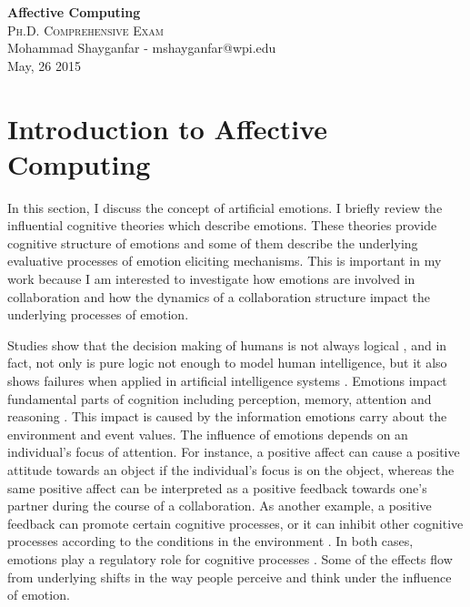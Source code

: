 \documentclass[11pt]{article}
\begin{document}

\begin{center}
{\LARGE{\textbf{Affective Computing}}} \\
\Large\textsc{Ph.D. Comprehensive Exam} \\[1em]
\large\textnormal{Mohammad Shayganfar - mshayganfar@wpi.edu} \\
\large\textnormal{May, 26 2015}
\end{center}

\section{Introduction to Affective Computing}

In this section, I discuss the concept of artificial emotions. I briefly review
the influential cognitive theories which describe emotions. These theories
provide cognitive structure of emotions and some of them describe the underlying
evaluative processes of emotion eliciting mechanisms. This is important in my
work because I am interested to investigate how emotions are involved in
collaboration and how the dynamics of a collaboration structure impact the
underlying processes of emotion.

Studies show that the decision making of
humans is not always logical \cite{GrossbergGutowski:affect-cognition}, and in
fact, not only is pure logic not enough to model human intelligence, but it also
shows failures when applied in artificial intelligence systems
\cite{dreyfus:artificial-critique}. Emotions impact fundamental parts of
cognition including perception, memory, attention and reasoning
\cite{clore:judgement-regulation}. This impact is caused by the information
emotions carry about the environment and event values. The influence of emotions
depends on an individual's focus of attention. For instance, a positive affect
can cause a positive attitude towards an object if the individual's focus is on
the object, whereas the same positive affect can be interpreted as a positive
feedback towards one's partner during the course of a collaboration. As another
example, a positive feedback can promote certain cognitive processes, or it can
inhibit other cognitive processes according to the conditions in the environment
\cite{clore:affective-guidance}. In both cases, emotions play a regulatory role
for cognitive processes \cite{gross:emotion-generation-regulation}. Some of the
effects flow from underlying shifts in the way people perceive and think under
the influence of emotion.
\end{document}
